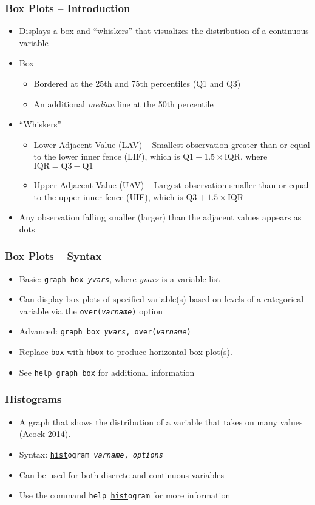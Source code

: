 \documentclass{beamer}
\begin{document}
\begin{frame}
	\frametitle{Box Plots -- Introduction}
	
	\begin{itemize}
		\item Displays a box and ``whiskers'' that visualizes the distribution of a continuous variable
		\item Box
		\begin{itemize}
			\item Bordered at the 25th and 75th percentiles (Q1 and Q3)
			\item An additional \textit{median} line at the 50th percentile
		\end{itemize}
		\item ``Whiskers''
		\begin{itemize}
			\item Lower Adjacent Value (LAV) -- Smallest observation greater than or equal to the lower inner fence (LIF), which is $\mbox{Q1}-1.5\times \mbox{IQR}$, where $\mbox{IQR}=\mbox{Q3}-\mbox{Q1}$
			\item Upper Adjacent Value (UAV) -- Largest observation smaller than or equal to the upper inner fence (UIF), which is $\mbox{Q3}+1.5\times \mbox{IQR}$
		\end{itemize}
		\item Any observation falling smaller (larger) than the adjacent values appears as dots 
	\end{itemize}
\end{frame}

\begin{frame}
	\frametitle{Box Plots -- Syntax}
	
	\begin{itemize}
		\item Basic: \texttt{graph box \textit{yvars}}, where \textit{yvars} is a variable list
		\item Can display box plots of specified variable(s) based on levels of a categorical variable via the \texttt{over(\textit{varname})} option
		\item Advanced: \texttt{graph box \textit{yvars}, over(\textit{varname})}
		\item Replace \texttt{box} with \texttt{hbox} to produce horizontal box plot(s).
		\item See \texttt{help graph box} for additional information
	\end{itemize}
\end{frame}

\begin{frame}
	\frametitle{Histograms}
	
	\begin{itemize}
		\item A graph that shows the distribution of a variable that takes on many values (Acock 2014).
		\item Syntax: \texttt{\underline{hist}ogram \textit{varname}, \textit{options}}
		\item Can be used for both discrete and continuous variables
		\item Use the command \texttt{help \underline{hist}ogram} for more information
	\end{itemize}
\end{frame}
\end{document}
